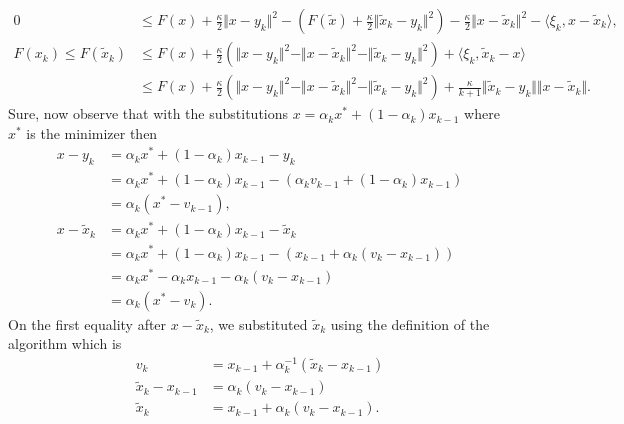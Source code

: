 \documentclass[12pt]{article}
\begin{document}
        {\small
        \begin{align*}
            0 &\le
            F(x) + \frac{\kappa}{2}\Vert x - y_k\Vert^2 
            - \left(
                F(\tilde x) 
                + \frac{\kappa}{2}\Vert \tilde x_k - y_k\Vert^2
            \right)
            - \frac{\kappa}{2}\Vert x - \tilde x_k\Vert^2 
            - \langle \xi_k, x - \tilde x_k\rangle
            , 
            \\
            F(x_k)
            \le F(\tilde x_k) 
            &\le 
            F(x) + \frac{\kappa}{2}\left(
                \Vert x - y_k\Vert^2 - \Vert x - \tilde x_k\Vert^2 - \Vert \tilde x_k - y_k\Vert^2
            \right)
            + \langle  \xi_k, \tilde x_k - x \rangle 
            \\
            &\le 
            F(x) + \frac{\kappa}{2}\left(
                \Vert x - y_k\Vert^2 - \Vert x - \tilde x_k\Vert^2 - \Vert \tilde x_k - y_k\Vert^2
            \right)
            + \frac{\kappa}{k + 1}\Vert \tilde x_k - y_k\Vert\Vert x - \tilde x_k\Vert. 
        \end{align*}
        }
        Sure, now observe that with the substitutions $x = \alpha_k x^* + (1 - \alpha_k) x_{k-1}$ where $x^*$ is the minimizer then
        \begin{align*}
            x - y_k
            &= 
            \alpha_k x^* + (1 - \alpha_k) x_{k - 1} - y_k 
            \\
            &= \alpha_k x^* + (1 - \alpha_k) x_{k - 1} - (\alpha_k v_{k - 1} + (1 - \alpha_k)x_{k - 1})
            \\
            &= \alpha_k (x^* - v_{k - 1}), 
            \\
            x - \tilde x_k 
            &= 
            \alpha_k x^* + (1 - \alpha_k) x_{k - 1} - \tilde x_k
            \\
            &= 
            \alpha_k x^* + (1 - \alpha_k) x_{k - 1} - (x_{k - 1} + \alpha_k(v_k - x_{k - 1}))
            \\
            &= \alpha_k x^* - \alpha_k x_{k - 1} - \alpha_k(v_k - x_{k - 1})
            \\
            &= \alpha_k (x^* - v_k). 
        \end{align*}
        On the first equality after $x - \tilde x_k$, we substituted $\tilde x_k$ using the definition of the algorithm which is 
        \begin{align*}
            v_{k} &= x_{k - 1} + \alpha_k^{-1}(\tilde x_k - x_{k - 1})
            \\
            \tilde x_k - x_{k - 1} &= \alpha_k(v_k - x_{k - 1})
            \\
            \tilde x_k &= x_{k - 1} + \alpha_k(v_k - x_{k - 1}). 
        \end{align*}
\end{document}
